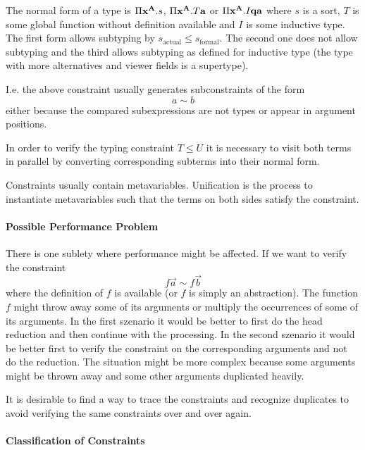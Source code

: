 The normal form of a type is $\Pi {{\mathbf x}^{{\mathbf A}}}. s$, $\Pi {{\mathbf x}^{{\mathbf A}}}. T {\mathbf a}$ or $\Pi {{\mathbf x}^{{\mathbf A}}} . I {\mathbf q} {\mathbf a}$ where $s$ is a sort, $T$ is some global
function without definition available and $I$ is some inductive type. The first
form allows subtyping by $s_\text{actual} \le s_\text{formal}$. The second one
does not allow subtyping and the third allows subtyping as defined for inductive
type (the type with more alternatives and viewer fields is a supertype).

I.e. the above constraint usually generates subconstraints of the form
$$
    a \sim b
$$
either because the compared subexpressions are not types or appear in argument
positions.

In order to verify the typing constraint $T \le U$ it is necessary to visit both
terms in parallel by converting corresponding subterms into their normal form.

Constraints usually contain metavariables. Unification is the process to
instantiate metavariables such that the terms on both sides satisfy the
constraint.






\paragraph{Possible Performance Problem}
There is one sublety where performance might be affected. If we want to verify
the constraint
$$
    f \vec a \sim f \vec b
$$
where the definition of $f$ is available (or $f$ is simply an abstraction). The
function $f$ might throw away some of its arguments or multiply the occurrences
of some of its arguments. In the first szenario it would be better to first do
the head reduction and then continue with the processing. In the second szenario
it would be better first to verify the constraint on the corresponding arguments
and not do the reduction. The situation might be more complex because some
arguments might be thrown away and some other arguments duplicated heavily.

It is desirable to find a way to trace the constraints and recognize duplicates
to avoid verifying the same constraints over and over again.






\paragraph{Classification of Constraints}

